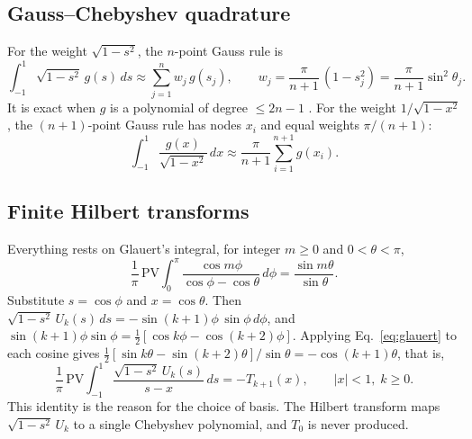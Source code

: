 \documentclass[12pt]{article}
\newcommand{\PV}{\mathrm{PV}\!\!}
\begin{document}
\subsection{Gauss--Chebyshev quadrature}
For the weight $\sqrt{1-s^2}$, the $n$-point Gauss rule is
\begin{equation}\label{eq:gauss}
	\int_{-1}^{1}\sqrt{1-s^2}\,g(s)\,ds \approx \sum_{j=1}^{n} w_j\, g(s_j),
	\qquad
	w_j = \frac{\pi}{n+1}\,(1-s_j^2) = \frac{\pi}{n+1}\sin^2\theta_j .
\end{equation}
It is exact when $g$ is a polynomial of degree $\le 2n-1$
\parencite{MasonHandscomb2003}. For the weight $1/\sqrt{1-x^2}$, the $(n+1)$-point
Gauss rule has nodes $x_i$ and equal weights $\pi/(n+1)$:
\begin{equation}\label{eq:gauss1}
	\int_{-1}^{1}\frac{g(x)}{\sqrt{1-x^2}}\,dx \approx \frac{\pi}{n+1}\sum_{i=1}^{n+1} g(x_i).
\end{equation}

\subsection{Finite Hilbert transforms}
Everything rests on Glauert's integral, for integer $m\ge0$ and $0<\theta<\pi$,
\begin{equation}\label{eq:glauert}
	\frac1\pi\,\PV\int_0^\pi \frac{\cos m\phi}{\cos\phi - \cos\theta}\,d\phi
	= \frac{\sin m\theta}{\sin\theta}.
\end{equation}
Substitute $s = \cos\phi$ and $x=\cos\theta$. Then
$\sqrt{1-s^2}\,U_k(s)\,ds = -\sin(k+1)\phi\,\sin\phi\,d\phi$, and
$\sin(k+1)\phi\sin\phi = \frac12[\cos k\phi - \cos(k+2)\phi]$. Applying
Eq.~\eqref{eq:glauert} to each cosine gives
$\frac12[\sin k\theta - \sin(k+2)\theta]/\sin\theta = -\cos(k+1)\theta$, that is,
\begin{equation}\label{eq:H2}
	\frac1\pi\,\PV\int_{-1}^{1}\frac{\sqrt{1-s^2}\,U_k(s)}{s-x}\,ds = -T_{k+1}(x),
	\qquad |x|<1,\; k\ge0 .
\end{equation}
This identity is the reason for the choice of basis. The Hilbert transform maps
$\sqrt{1-s^2}\,U_k$ to a single Chebyshev polynomial, and $T_0$ is never produced.
\end{document}
